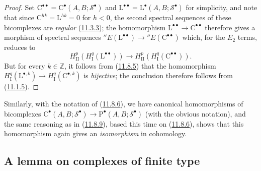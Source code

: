 \begin{proof}
Set $\mathrm C^{\bullet\bullet}=
\mathrm C^\bullet(A,B;\mathscr S^\bullet)$ and
$\mathrm L^{\bullet\bullet}=
\mathrm L^\bullet(A,B;\mathscr S^\bullet)$ for simplicity, and note that
since $\mathrm C^{hk}=\mathrm L^{hk}=0$ for $h<0$, the second spectral
sequences of these bicomplexes are \emph{regular}
(\hyperref[0.11.3.3]{11.3.3}); the homomorphism
$\mathrm L^{\bullet\bullet}\to\mathrm C^{\bullet\bullet}$ therefore gives a
morphism of spectral sequences ${}''E(\mathrm L^{\bullet\bullet})\to
{}''E(\mathrm C^{\bullet\bullet})$
which, for the $E_2$ terms, reduces to
\[
\label{0.11.8.9.1}
\tag{11.8.9.1}
H^p_{\mathrm{II}}(H^q_{\mathrm I}(\mathrm L^{\bullet\bullet}))
\longrightarrow
H^p_{\mathrm{II}}(H^q_{\mathrm I}(\mathrm C^{\bullet\bullet})).
\]
But for every $k\in\mathbb Z$, it follows from
(\hyperref[0.11.8.5]{11.8.5}) that the homomorphism
$H^q_{\mathrm I}(\mathrm L^{\bullet,k})\to
H^q_{\mathrm I}(\mathrm C^{\bullet,k})$ is \emph{bijective}; the conclusion
therefore follows from (\hyperref[0.11.1.5]{11.1.5}).
\end{proof}

\begin{env}[11.8.10]
\label{0.11.8.10}
Similarly, with the notation of (\hyperref[0.11.8.6]{11.8.6}), we have
canonical homomorphisms of bicomplexes $\mathrm C^\bullet(A,B;\mathscr S^\bullet)\longrightarrow
\mathrm P^\bullet(A,B;\mathscr S^\bullet)$
(with the obvious notation), and the same reasoning as in
(\hyperref[0.11.8.9]{11.8.9}), based this time on
(\hyperref[0.11.8.6]{11.8.6}), shows that this homomorphism again gives
an \emph{isomorphism} in cohomology.
\end{env}

\subsection{A lemma on complexes of finite type}
\label{subsection:0.11.9}

